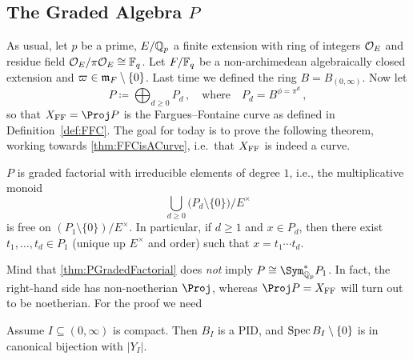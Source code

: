 \subsection{The Graded Algebra \texorpdfstring{$P$}{P}}
As usual, let $p$ be a prime, $E/\mathbb{Q}_p$ a finite extension with ring of integers $\mathcal{O}_E$ and residue field $\mathcal{O}_E/\pi\mathcal{O}_E\cong \mathbb{F}_q$. Let $F/\mathbb{F}_q$ be a non-archimedean algebraically closed extension and $\varpi\in\mathfrak{m}_F\setminus\{0\}$.
Last time we defined the ring $B=B_{(0,\infty)}$. Now let
\begin{equation*}
	P\coloneqq \bigoplus_{d\geq 0}P_d\,,\quad\text{where}\quad P_d=B^{\phi=\pi^d}\,,
\end{equation*}
so that $X_\FFC=\Proj P$ is the Fargues--Fontaine curve as defined in Definition~\cref{def:FFC}. The goal for today is to prove the following theorem, working towards \cref{thm:FFCisACurve}, i.e.\ that $X_{\mathrm{FF}}$ is indeed a curve.
\begin{thm}\label{thm:PGradedFactorial}
	$P$ is graded factorial with irreducible elements of degree $1$, i.e., the multiplicative monoid
	\begin{equation*}
		\bigcup_{d\geq 0}\big(P_d\setminus\{0\}\big)/E^\times
	\end{equation*}
	is free on $(P_1\setminus\{0\})/E^\times$. In particular, if $d\geq 1$ and $x\in P_d$, then there exist $t_1,\dotsc,t_d\in P_1$ (unique up $E^\times$ and order) such that $x=t_1\dotsm t_d$.
\end{thm}
Mind that \cref{thm:PGradedFactorial} does \emph{not} imply $P\cong \Sym_{\IQ_p}^*P_1$. In fact, the right-hand side has non-noetherian $\Proj$, whereas $\Proj P=X_\FFC$ will turn out to be noetherian. For the proof we need
\begin{thm}\label{thm:BIPID}
	Assume $I\subseteq (0,\infty)$ is compact. Then $B_I$ is a PID, and $\operatorname{Spec} B_I\setminus\{0\}$ is in canonical bijection with $|Y_I|$.
\end{thm}
